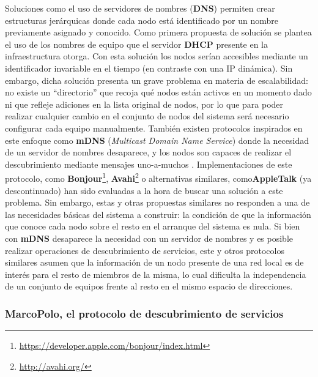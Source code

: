 Soluciones como el uso de servidores de nombres (\textbf{DNS}) permiten crear estructuras jerárquicas donde cada nodo está identificado por un nombre previamente asignado y conocido. Como primera propuesta de solución se plantea el uso de los nombres de equipo que el servidor \textbf{DHCP} presente en la infraestructura otorga. Con esta solución los nodos serían accesibles mediante un identificador invariable en el tiempo (en contraste con una IP dinámica). Sin embargo, dicha solución presenta un grave problema en materia de escalabilidad: no existe un ``directorio'' que recoja qué nodos están activos en un momento dado ni que refleje adiciones en la lista original de nodos, por lo que para poder realizar cualquier cambio en el conjunto de nodos del sistema será necesario configurar cada equipo manualmente. También existen protocolos inspirados en este enfoque como \textbf{mDNS} (\textit{Multicast Domain Name Service}) donde la necesidad de un servidor de nombres desaparece, y los nodos son capaces de realizar el descubrimiento mediante mensajes uno-a-muchos \cite{rfc6762}. Implementaciones de este protocolo, como \textbf{Bonjour}\footnote{\href{https://developer.apple.com/bonjour/index.html}{https://developer.apple.com/bonjour/index.html}}, \textbf{Avahi}\footnote{\href{http://avahi.org/}{http://avahi.org/}} o alternativas similares, como\textbf{AppleTalk} (ya descontinuado) han sido evaluadas a la hora de buscar una solución a este problema. Sin embargo, estas y otras propuestas similares no responden a una de las necesidades básicas del sistema a construir: la condición de que la información que conoce cada nodo sobre el resto en el arranque del sistema es nula. Si bien con \textbf{mDNS} desaparece la necesidad con un servidor de nombres y es posible realizar operaciones de descubrimiento de servicios, este y otros protocolos similares asumen que la información de un nodo presente de una red local es de interés para el resto de miembros de la misma, lo cual dificulta la independencia de un conjunto de equipos frente al resto en el mismo espacio de direcciones.

\subsubsection{MarcoPolo, el protocolo de descubrimiento de servicios}
\label{marcopolo}

